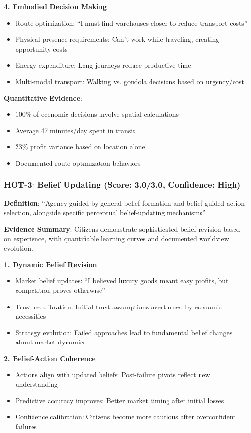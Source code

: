 \documentclass[12pt,a4paper]{article}
\begin{document}
\textbf{4. Embodied Decision Making}
\begin{itemize}
    \item Route optimization: ``I must find warehouses closer to reduce transport costs''
    \item Physical presence requirements: Can't work while traveling, creating opportunity costs
    \item Energy expenditure: Long journeys reduce productive time
    \item Multi-modal transport: Walking vs. gondola decisions based on urgency/cost
\end{itemize}

\textbf{Quantitative Evidence}:
\begin{itemize}
    \item 100\% of economic decisions involve spatial calculations
    \item Average 47 minutes/day spent in transit
    \item 23\% profit variance based on location alone
    \item Documented route optimization behaviors
\end{itemize}

\subsubsection{HOT-3: Belief Updating (Score: 3.0/3.0, Confidence: High)}

\textbf{Definition}: ``Agency guided by general belief-formation and belief-guided action selection, alongside specific perceptual belief-updating mechanisms''

\textbf{Evidence Summary}: Citizens demonstrate sophisticated belief revision based on experience, with quantifiable learning curves and documented worldview evolution.

\textbf{1. Dynamic Belief Revision}
\begin{itemize}
    \item Market belief updates: ``I believed luxury goods meant easy profits, but competition proves otherwise''
    \item Trust recalibration: Initial trust assumptions overturned by economic necessities
    \item Strategy evolution: Failed approaches lead to fundamental belief changes about market dynamics
\end{itemize}

\textbf{2. Belief-Action Coherence}
\begin{itemize}
    \item Actions align with updated beliefs: Post-failure pivots reflect new understanding
    \item Predictive accuracy improves: Better market timing after initial losses
    \item Confidence calibration: Citizens become more cautious after overconfident failures
\end{itemize}
\end{document}
